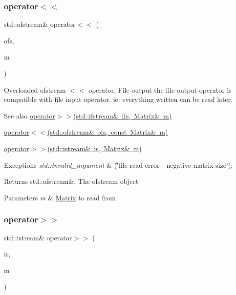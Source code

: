 \subsubsection{\texorpdfstring{operator$<$$<$}{operator<<}\hspace{0.1cm}{\footnotesize\ttfamily [2/2]}}
{\footnotesize\ttfamily std\+::ofstream\& operator$<$$<$ (\begin{DoxyParamCaption}\item[{std\+::ofstream \&}]{ofs,  }\item[{const \mbox{\hyperlink{class_matrix}{Matrix}} \&}]{m }\end{DoxyParamCaption})\hspace{0.3cm}{\ttfamily [friend]}}

Overloaded ofstream $<$$<$ operator. File output the file output operator is compatible with file input operator, ie. everything written can be read later. \begin{DoxySeeAlso}{See also}
\mbox{\hyperlink{class_matrix_aa5699a0bdf0ee014f083ff8a76629d21}{operator$>$$>$(std\+::ifstream\& ifs, Matrix\& m)}} 

\mbox{\hyperlink{class_matrix_aa574249d63b390cf1108d6e82047ef61}{operator$<$$<$(std\+::ofstream\& ofs, const Matrix\& m)}} 

\mbox{\hyperlink{class_matrix_a3d6c1dcfc038804f4c08687f4f37f48b}{operator$>$$>$(std\+::istream\& is, Matrix\& m)}} 
\end{DoxySeeAlso}

\begin{DoxyExceptions}{Exceptions}
{\em std\+::invalid\+\_\+argument} & (\char`\"{}file read error -\/ negative matrix size\char`\"{}); \\
\hline
\end{DoxyExceptions}
\begin{DoxyReturn}{Returns}
std\+::ofstream\&. The ofstream object 
\end{DoxyReturn}

\begin{DoxyParams}{Parameters}
{\em m} & \mbox{\hyperlink{class_matrix}{Matrix}} to read from \\
\hline
\end{DoxyParams}
\mbox{\label{class_matrix_a3d6c1dcfc038804f4c08687f4f37f48b}} 
\subsubsection{\texorpdfstring{operator$>$$>$}{operator>>}\hspace{0.1cm}{\footnotesize\ttfamily [1/2]}}
{\footnotesize\ttfamily std\+::istream\& operator$>$$>$ (\begin{DoxyParamCaption}\item[{std\+::istream \&}]{is,  }\item[{\mbox{\hyperlink{class_matrix}{Matrix}} \&}]{m }\end{DoxyParamCaption})\hspace{0.3cm}{\ttfamily [friend]}}

